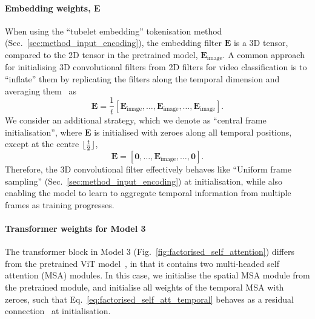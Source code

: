 \paragraph{Embedding weights, $\mathbf{E}$}
When using the ``tubelet embedding'' tokenisation method (Sec.~\ref{sec:method_input_encoding}), the embedding filter $\mathbf{E}$ is a 3D tensor, compared to the 2D tensor in the pretrained model,  $\mathbf{E}_{\text{image}}$. A common approach for initialising 3D convolutional filters from 2D filters for video classification is to ``inflate'' them by replicating the filters along the temporal dimension and averaging them~\cite{carreira_cvpr_2017, feichtenhofer_neurips_2016} as
\begin{equation}
\mathbf{E} = \frac{1}{t}[\mathbf{E}_{\text{image}}, \ldots, \mathbf{E}_{\text{image}}, \ldots, \mathbf{E}_{\text{image}}].
\end{equation}
We consider an additional strategy, which we denote as ``central frame initialisation'', where $\mathbf{E}$ is initialised with zeroes along all temporal positions, except at the centre $\lfloor\frac{t}{2}\rfloor$,
\begin{equation}
\mathbf{E} = [\mathbf{0}, \ldots,  \mathbf{E}_{\text{image}}, \ldots, \mathbf{0}].
\label{eq:central_frame_init}
\end{equation}
Therefore, the 3D convolutional filter effectively behaves like ``Uniform frame sampling'' (Sec.~\ref{sec:method_input_encoding}) at initialisation, while also enabling the model to learn to aggregate temporal information from multiple frames as training progresses.

\paragraph{Transformer weights for Model 3}
The transformer block in Model 3 (Fig.~\ref{fig:factorised_self_attention}) differs from the pretrained ViT model~\cite{dosovitskiy_iclr_2021}, in that it contains two multi-headed self attention (MSA) modules.
In this case, we initialise the spatial MSA module from the pretrained module, and initialise all weights of the temporal MSA with zeroes, such that Eq.~\ref{eq:factorised_self_att_temporal} behaves as a residual connection~\cite{he_cvpr_2016} at initialisation.


